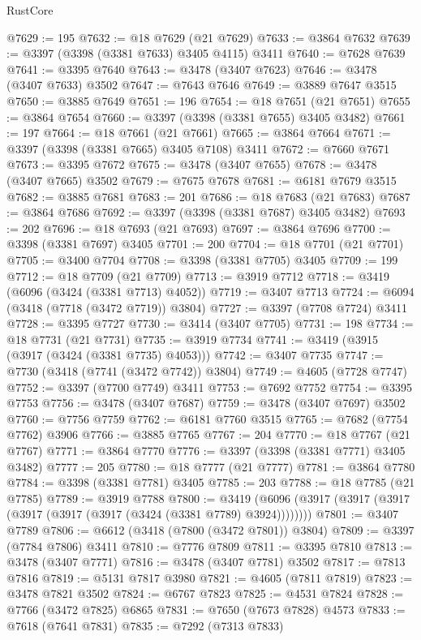 \begin{lexlean}{RustCore}
\begin{coremodule}
@7629 := 195
@7632 := @18 @7629 (@21 @7629)
@7633 := @3864 @7632
@7639 := @3397 (@3398 (@3381 @7633) @3405 @4115) @3411
@7640 := @7628 @7639
@7641 := @3395 @7640
@7643 := @3478 (@3407 @7623)
@7646 := @3478 (@3407 @7633) @3502
@7647 := @7643 @7646
@7649 := @3889 @7647 @3515
@7650 := @3885 @7649
@7651 := 196
@7654 := @18 @7651 (@21 @7651)
@7655 := @3864 @7654
@7660 := @3397 (@3398 (@3381 @7655) @3405 @3482)
@7661 := 197
@7664 := @18 @7661 (@21 @7661)
@7665 := @3864 @7664
@7671 := @3397 (@3398 (@3381 @7665) @3405 @7108) @3411
@7672 := @7660 @7671
@7673 := @3395 @7672
@7675 := @3478 (@3407 @7655)
@7678 := @3478 (@3407 @7665) @3502
@7679 := @7675 @7678
@7681 := @6181 @7679 @3515
@7682 := @3885 @7681
@7683 := 201
@7686 := @18 @7683 (@21 @7683)
@7687 := @3864 @7686
@7692 := @3397 (@3398 (@3381 @7687) @3405 @3482)
@7693 := 202
@7696 := @18 @7693 (@21 @7693)
@7697 := @3864 @7696
@7700 := @3398 (@3381 @7697) @3405
@7701 := 200
@7704 := @18 @7701 (@21 @7701)
@7705 := @3400 @7704
@7708 := @3398 (@3381 @7705) @3405
@7709 := 199
@7712 := @18 @7709 (@21 @7709)
@7713 := @3919 @7712
@7718 := @3419 (@6096 (@3424 (@3381 @7713) @4052))
@7719 := @3407 @7713
@7724 := @6094 (@3418 (@7718 (@3472 @7719)) @3804)
@7727 := @3397 (@7708 @7724) @3411
@7728 := @3395 @7727
@7730 := @3414 (@3407 @7705)
@7731 := 198
@7734 := @18 @7731 (@21 @7731)
@7735 := @3919 @7734
@7741 := @3419 (@3915 (@3917 (@3424 (@3381 @7735) @4053)))
@7742 := @3407 @7735
@7747 := @7730 (@3418 (@7741 (@3472 @7742)) @3804)
@7749 := @4605 (@7728 @7747)
@7752 := @3397 (@7700 @7749) @3411
@7753 := @7692 @7752
@7754 := @3395 @7753
@7756 := @3478 (@3407 @7687)
@7759 := @3478 (@3407 @7697) @3502
@7760 := @7756 @7759
@7762 := @6181 @7760 @3515
@7765 := @7682 (@7754 @7762) @3906
@7766 := @3885 @7765
@7767 := 204
@7770 := @18 @7767 (@21 @7767)
@7771 := @3864 @7770
@7776 := @3397 (@3398 (@3381 @7771) @3405 @3482)
@7777 := 205
@7780 := @18 @7777 (@21 @7777)
@7781 := @3864 @7780
@7784 := @3398 (@3381 @7781) @3405
@7785 := 203
@7788 := @18 @7785 (@21 @7785)
@7789 := @3919 @7788
@7800 := @3419 (@6096 (@3917 (@3917 (@3917 (@3917 (@3917 (@3917 (@3424 (@3381 @7789) @3924))))))))
@7801 := @3407 @7789
@7806 := @6612 (@3418 (@7800 (@3472 @7801)) @3804)
@7809 := @3397 (@7784 @7806) @3411
@7810 := @7776 @7809
@7811 := @3395 @7810
@7813 := @3478 (@3407 @7771)
@7816 := @3478 (@3407 @7781) @3502
@7817 := @7813 @7816
@7819 := @5131 @7817 @3980
@7821 := @4605 (@7811 @7819)
@7823 := @3478 @7821 @3502
@7824 := @6767 @7823
@7825 := @4531 @7824
@7828 := @7766 (@3472 @7825) @6865
@7831 := @7650 (@7673 @7828) @4573
@7833 := @7618 (@7641 @7831)
@7835 := @7292 (@7313 @7833)

\end{coremodule}
\end{lexlean}

